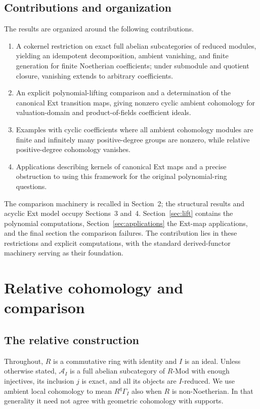 \documentclass[11pt,reqno]{amsart}
\theoremstyle{definition}
\theoremstyle{remark}
\newcommand{\Mod}{\text{-}\mathrm{Mod}}
\newcommand{\A}{\mathcal A_I}
\begin{document}
\subsection{Contributions and organization}
The results are organized around the following contributions.
\begin{enumerate}[label=(\roman*)]
\item A cokernel restriction on exact full abelian subcategories of reduced modules, yielding an idempotent decomposition, ambient vanishing, and finite generation for finite Noetherian coefficients; under submodule and quotient closure, vanishing extends to arbitrary coefficients.
\item An explicit polynomial-lifting comparison and a determination of the canonical Ext transition maps, giving nonzero cyclic ambient cohomology for valuation-domain and product-of-fields coefficient ideals.
\item Examples with cyclic coefficients where all ambient cohomology modules are finite and infinitely many positive-degree groups are nonzero, while relative positive-degree cohomology vanishes.
\item Applications describing kernels of canonical Ext maps and a precise obstruction to using this framework for the original polynomial-ring questions.
\end{enumerate}
The comparison machinery is recalled in Section~2; the structural results and acyclic Ext model occupy Sections~3 and~4. Section~\ref{sec:lift} contains the polynomial computations, Section~\ref{sec:applications} the Ext-map applications, and the final section the comparison failures. The contribution lies in these restrictions and explicit computations, with the standard derived-functor machinery serving as their foundation.


\section{Relative cohomology and comparison}
\subsection{The relative construction}
Throughout, $R$ is a commutative ring with identity and $I$ is an ideal. Unless otherwise stated, $\A$ is a full abelian subcategory of $R\Mod$ with enough injectives, its inclusion $j$ is exact, and all its objects are $I$-reduced. We use ambient local cohomology to mean $R^q\Gamma_I$ also when $R$ is non-Noetherian. In that generality it need not agree with geometric cohomology with supports.
\end{document}
